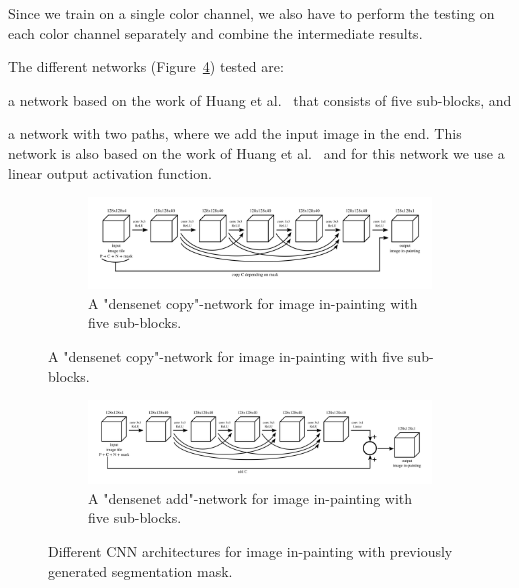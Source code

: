 Since we train on a single color channel, we also have to perform the testing on each color channel separately and combine the intermediate results.


The different networks (Figure~\ref{fig:paint_architectures}) tested are: \begin{enumerate*}[label=(\alph*)] \item a network based on the work of Huang et al.~\cite{Huang16} that consists of five sub-blocks, and \item a network with two paths, where we add the input image in the end. This network is also based on the work of Huang et al.~\cite{Huang16} and for this network we use a linear output activation function.\end{enumerate*}



\begin{figure}[H]
\centering
	\begin{subfigure}{.95\textwidth}
	\includegraphics[width=\linewidth]{models_painting/densenet.png}
	\caption[figure]{A "densenet copy"-network for image in-painting with five sub-blocks.}
	\label{fig:paint_densenet}
	\end{subfigure}
\end{figure}
\begin{figure}[H]
  \ContinuedFloat
  \centering
  \begin{subfigure}{.95\textwidth}
	\includegraphics[width=\linewidth]{models_painting/densenet2.png}
	\caption[figure]{A "densenet add"-network for image in-painting with five sub-blocks.}
	\label{fig:paint_densenet2}
	\end{subfigure}
  	
	\caption[figure]{Different CNN architectures for image in-painting with previously generated segmentation mask.}
		\label{fig:paint_architectures}
\end{figure}


